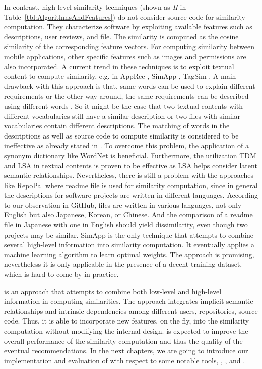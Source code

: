 In contrast, high-level similarity techniques (shown as \textit{H} in Table~\ref{tbl:AlgorithmsAndFeatures}) do not consider source code for similarity computation. They characterize software by exploiting available features such as descriptions, user reviews, and  file. The similarity is computed as the cosine similarity of the corresponding feature vectors. For computing similarity between mobile applications, other specific features such as images and permissions are also incorporated. A current trend in these techniques is to exploit textual content to compute similarity, e.g. in AppRec \cite{confairsBhandariSDJ13}, SimApp \cite{Chen:2015:SFD:2684822.2685305}, TagSim \cite{Lo:2012:DSA:2473496.2473616}. A main drawback with this approach is that, same words can be used to explain different requirements or the other way around, the same requirements can be described using different words \cite{10.1109/APSEC.2004.69}. So it might be the case that two textual contents with different vocabularies still have a similar description or two files with similar vocabularies contain different descriptions. The matching of words in the descriptions as well as source code to compute similarity is considered to be ineffective as already stated in \cite{McMillan:2012:DSS:2337223.2337267}. To overcome this problem, the application of a synonym dictionary like WordNet \cite{Miller:1995:WLD:219717.219748} is beneficial. Furthermore, the utilization TDM and LSA in textual contents is proven to be effective as LSA helps consider latent semantic relationships. Nevertheless, there is still a problem with the approaches like RepoPal where readme file is used for similarity computation, since in general the descriptions for software projects are written in different languages. According to our observation in GitHub,  files are written in various languages, \eg not only English but also Japanese, Korean, or Chinese. And the comparison of a readme file in Japanese with one in English should yield dissimilarity, even though two projects may be similar. SimApp \cite{Chen:2015:SFD:2684822.2685305} is the only technique that attempts to combine several high-level information into similarity computation. It eventually applies a machine learning algorithm to learn optimal weights. The approach is promising, nevertheless it is only applicable in the presence of a decent training dataset, which is hard to come by in practice.

\CrossSim is an approach that attempts to combine both low-level and high-level information in computing similarities. The approach integrates implicit semantic relationships and intrinsic dependencies among different users, repositories, source code. Thus, it is able to incorporate new features, on the fly, into the similarity computation without modifying the internal design. \CrossSim is expected to improve the overall performance of the similarity computation and thus the quality of the eventual recommendations. In the next chapters, we are going to introduce our implementation and evaluation of \CrossSim with respect to some notable tools, \ie \MUDABlue, \CLAN, and \RepoPal.


